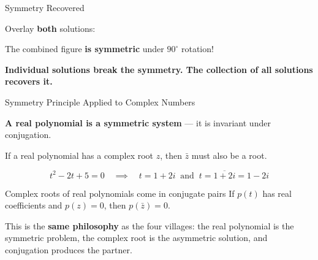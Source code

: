 \documentclass[10pt]{beamer}
\theoremstyle{definition}
\newcommand{\x}[1]{\alert{\textbf{#1}}}
\begin{document}
\begin{frame}{Symmetry Recovered}

Overlay \x{both} solutions:

\vfill

\begin{center}
\end{center}

\vfill

The combined figure \x{is symmetric} under $90^{\circ}$ rotation!

\vfill\pause

\x{Individual solutions break the symmetry. The collection of all solutions recovers it.}

\end{frame}


\begin{frame}{Symmetry Principle Applied to Complex Numbers}

\x{A real polynomial is a symmetric system} --- it is invariant under conjugation.

\vfill

If a real polynomial has a complex root $z$, then $\bar{z}$ must also be a root.

\vfill\pause

$$t^2 - 2t + 5 = 0 \quad\implies\quad t = 1 + 2i \;\;\text{and}\;\; t = \overline{1+2i} = 1 - 2i$$

\vfill\pause

\begin{block}{Complex roots of real polynomials come in conjugate pairs}
If $p(t)$ has real coefficients and $p(z) = 0$, then $p(\bar{z}) = 0$.
\end{block}

\vfill

This is the \x{same philosophy} as the four villages: the real polynomial is the symmetric problem, the complex root is the asymmetric solution, and conjugation produces the partner.

\end{frame}
\end{document}
